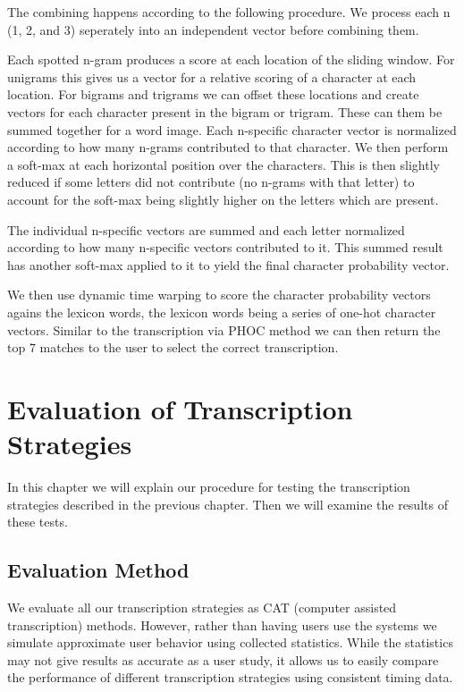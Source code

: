 \documentclass[ms,electronic,twosidetoc,letterpaper,chaptercenter,parttop,lof,lot]{byumsphd}
\begin{document}
The combining happens according to the following procedure.
We process each n (1, 2, and 3) seperately into an independent vector before combining them.

Each spotted n-gram produces a score at each location of the sliding window. For unigrams this gives us a vector for a relative scoring of a character at each location. For bigrams and trigrams we can offset these locations and create vectors for each character present in the bigram or trigram. These can them be summed together for a word image.
Each n-specific character vector is normalized according to how many n-grams contributed to that character.
We then perform a soft-max at each horizontal position over the characters. This is then slightly reduced if some letters did not contribute (no n-grams with that letter) to account for the soft-max being slightly higher on the letters which are present.

The individual n-specific vectors are summed and each letter normalized according to how many n-specific vectors contributed to it.
This summed result has another soft-max applied to it to yield the final character probability vector.

We then use dynamic time warping to score the character probability vectors agains the lexicon words, the lexicon words being a series of one-hot character vectors. Similar to the transcription via PHOC method we can then return the top 7 matches to the user to select the correct transcription.




\chapter{Evaluation of Transcription Strategies}

In this chapter we will explain our procedure for testing the transcription strategies described in the previous chapter. Then we will examine the results of these tests.

\section{Evaluation Method}

We evaluate all our transcription strategies as CAT (computer assisted transcription) methods. However, rather than having users use the systems we simulate approximate user behavior using collected statistics. While the statistics may not give results as accurate as a user study, it allows us to easily compare the performance of different transcription strategies using consistent timing data.
\end{document}
